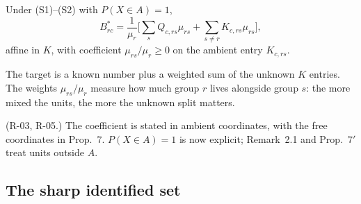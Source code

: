\begin{result}\label{res:p2a-l2}
 Under (S1)--(S2) with $P(X\in A)=1$,
\[
B^*_{rc}=\frac1{\mu_r}\Big[\sum_sQ_{c,rs}\mu_{rs}+\sum_{s\ne r}K_{c,rs}\mu_{rs}\Big],
\]
affine in $K$, with coefficient $\mu_{rs}/\mu_r\ge0$ on the ambient entry $K_{c,rs}$.
\end{result}
\begin{plain}
The target is a known number plus a weighted sum of the unknown $K$ entries. The
weights $\mu_{rs}/\mu_r$ measure how much group $r$ lives alongside group $s$:
the more mixed the units, the more the unknown split matters.
\end{plain}
\begin{revnote}
(R-03, R-05.) The coefficient is stated in ambient coordinates, with the free
coordinates in Prop.~7. $P(X\in A)=1$ is now explicit; Remark~2.1 and
Prop.~7$'$ treat units outside $A$.
\end{revnote}

\subsection{The sharp identified set}

